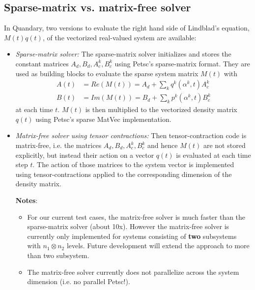 \documentclass[11pt]{article}
\begin{document}
   \subsection{Sparse-matrix vs. matrix-free solver}

   In Quandary, two versions to evaluate the right hand side of Lindblad's
   equation, $M(t)q(t)$, of the vectorized real-valued system are available:
   \begin{itemize}
     \item \textit{Sparse-matrix solver:}
      The sparse-matrix solver initializes and stores the constant matrices
       $A_d,B_d, A_c^k, B_c^k$ using Petsc's sparse-matrix format. They are used
       as building blocks to evaluate the sparse system matrix $M(t)$ with 
     \begin{align}
       A(t) &= Re(M(t)) = A_d + \sum_kq^k(\alpha^k, t)A_c^k \\
       B(t) &= Im(M(t)) = B_d + \sum_k p^k(\alpha^k, t)B_c^k
     \end{align}
   at each time $t$. $M(t)$ is then multiplied to the vectorized density matrix
       $q(t)$ using Petsc's sparse MatVec implementation. 

   \item \textit{Matrix-free solver using tensor contractions:}
     Then tensor-contraction code is matrix-free, i.e. the matrices $A_d,B_d,
       A_c^k, B_c^k$ and hence $M(t)$ are not stored explicitly, but instead
       their action on a vector $q(t)$ is evaluated at each time step $t$. The
       action of those matrices to the system vector is implemented using
       tensor-contractions applied to the corresponding dimension of the density
       matrix. 

     \textbf{Notes}:
     \begin{itemize}
       \item For our current test cases, the matrix-free solver is much faster
         than the sparse-matrix solver (about 10x). However the matrix-free solver
         is currently only implemented for systems consisting of \textbf{two}
         subsystems with $n_1 \otimes n_2$ levels. Future development will
         extend the approach to more than two subsystem. 
       \item The matrix-free solver currently does not parallelize across the
         system dimension (i.e. no parallel Petsc!).
     \end{itemize}


   \end{itemize}
\end{document}
